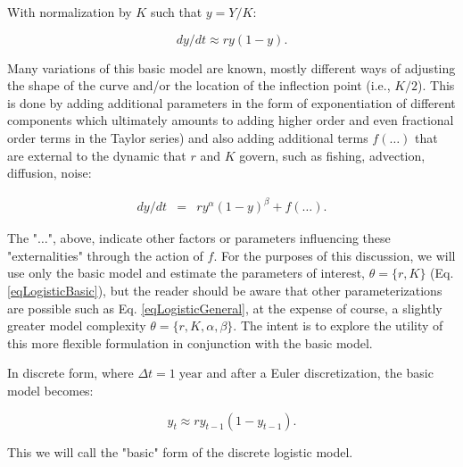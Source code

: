 \documentclass[letterpaper,portrait,11pt]{scrartcl}
\numberwithin{equation}{section}    %
\numberwithin{figure}{section}    %
\numberwithin{table}{section}       %
\begin{document}
\begin{appendices}
With normalization by $K$ such that $ y = Y/K $:

\begin{equation} 
\label{eqLogisticBasic}
dy/dt  \approx  r y (1 - y).
\end{equation}

Many variations of this basic model are known, mostly different ways of adjusting the shape of the curve and/or the location of the inflection point (i.e., $K/2$). This is done by adding additional parameters in the form of exponentiation of different components which ultimately amounts to adding higher order and even fractional order terms in the Taylor series) and also adding additional terms $f(\dots)$ that are external to the dynamic that $r$ and $K$ govern, such as fishing, advection, diffusion, noise: 

\begin{eqnarray} 
\label{eqLogisticGeneral}
dy / dt &=& r y^{\alpha} ( 1 - y )^{\beta} + f(\dots).
\end{eqnarray}

The "$\dots$", above, indicate other factors or parameters influencing these "externalities" through the action of $f$. For the purposes of this discussion, we will use only the basic model and estimate the parameters of interest, $\theta = \{r, K \}$ (Eq. \ref{eqLogisticBasic}), but the reader should be aware that other parameterizations are possible such as Eq. \ref{eqLogisticGeneral}, at the expense of course, a slightly greater model complexity $\theta=\{r,K,\alpha,\beta\}$. The intent is to explore the utility of this more flexible formulation in conjunction with the basic model. 

In discrete form, where $\Delta t = 1 \; \text{year}$ and after a Euler discretization, the basic model becomes:

\begin{equation} 
\label{eqLogisticDiscrete:appendix}
y_t  \approx r y_{t-1} (1 - y_{t-1} ).
\end{equation}

This we will call the "basic" form of the discrete logistic model.


\end{appendices}
\end{document}
